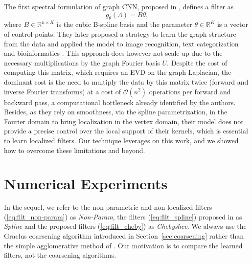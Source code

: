 \documentclass{article}
\newcommand{\bO}{\mathcal{O}}
\newcommand{\R}{\mathbb{R}}
\newcommand{\secref}[1]{Section~\ref{sec:#1}}
\newcommand{\eqnref}[1]{(\ref{eq:#1})}
\begin{document}
The first spectral formulation of graph CNN, proposed in
\cite{art:BrunaZarembaSzlamLeCun13DLgraphs}, defines a filter as
\begin{equation} \label{eq:filt_spline}
	g_\theta(\Lambda) = B \theta,
\end{equation}
where $B \in \R^{n \times K}$ is the cubic B-spline basis and the parameter
$\theta \in \R^K$ is a vector of control points.
They later proposed a strategy to learn the graph structure from the data and
applied the model to image recognition, text categorization and bioinformatics
\cite{art:HenaffBrunaLeCun15DLgraphs}.
This approach does however not scale up due to the necessary multiplications by
the graph Fourier basis $U$. Despite the cost of computing this matrix, which
requires an EVD on the graph Laplacian, the dominant cost is the need to
multiply the data by this matrix twice (forward and inverse Fourier transforms)
at a cost of $\bO(n^2)$ operations per forward and backward pass, a
computational bottleneck already identified by the authors.  Besides, as they
rely on smoothness, via the spline parametrization, in the Fourier domain to
bring localization in the vertex domain, their model does not provide a precise
control over the local support of their kernels, which is essential to learn
localized filters. Our technique leverages on this work, and we showed how to
overcome these limitations and beyond.

\section{Numerical Experiments}


In the sequel, we refer to the non-parametric and non-localized filters
\eqnref{filt_non-param} as \textit{Non-Param}, the filters \eqnref{filt_spline}
proposed in \cite{art:BrunaZarembaSzlamLeCun13DLgraphs} as \textit{Spline} and the proposed filters
\eqnref{filt_cheby} as \textit{Chebyshev}. We always use the Graclus coarsening
algorithm introduced in \secref{coarsening} rather than the simple
agglomerative method of \cite{art:BrunaZarembaSzlamLeCun13DLgraphs}. Our motivation is to compare the learned
filters, not the coarsening algorithms.
\end{document}
